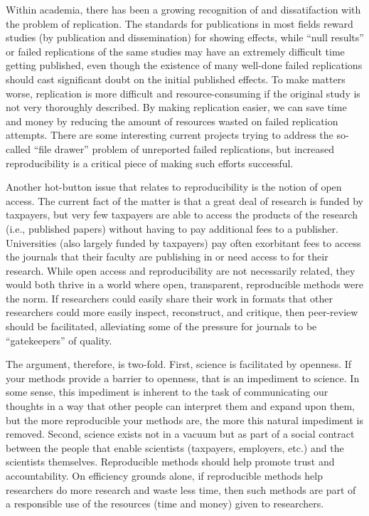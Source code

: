 \documentclass{book}
\begin{document}
Within academia, there has been a growing recognition of and dissatifaction with the problem of replication. The standards for publications in most fields reward studies (by publication and dissemination) for showing effects, while ``null results'' or failed replications of the same studies may have an extremely difficult time getting published, even though the existence of many well-done failed replications should cast significant doubt on the initial published effects. To make matters worse, replication is more difficult and resource-consuming if the original study is not very thoroughly described. By making replication easier, we can save time and money by reducing the amount of resources wasted on failed replication attempts. There are some interesting current projects trying to address the so-called ``file drawer'' problem of unreported failed replications, but increased reproducibility is a critical piece of making such efforts successful.

Another hot-button issue that relates to reproducibility is the notion of open access. The current fact of the matter is that a great deal of research is funded by taxpayers, but very few taxpayers are able to access the products of the research (i.e., published papers) without having to pay additional fees to a publisher.  Universities (also largely funded by taxpayers) pay often exorbitant fees to access the journals that their faculty are publishing in or need access to for their research.  While open access and reproducibility are not necessarily related, they would both thrive in a world where open, transparent, reproducible methods were the norm. If researchers could easily share their work in formats that other researchers could more easily inspect, reconstruct, and critique, then peer-review should be facilitated, alleviating some of the pressure for journals to be ``gatekeepers'' of quality.

The argument, therefore, is two-fold.  First, science is facilitated by openness.  If your methods provide a barrier to openness, that is an impediment to science. In some sense, this impediment is inherent to the task of communicating our thoughts in a way that other people can interpret them and expand upon them, but the more reproducible your methods are, the more this natural impediment is removed. Second, science exists not in a vacuum but as part of a social contract between the people that enable scientists (taxpayers, employers, etc.) and the scientists themselves. Reproducible methods should help promote trust and accountability. On efficiency grounds alone, if reproducible methods help researchers do more research and waste less time, then such methods are part of a responsible use of the resources (time and money) given to researchers. 
\end{document}
